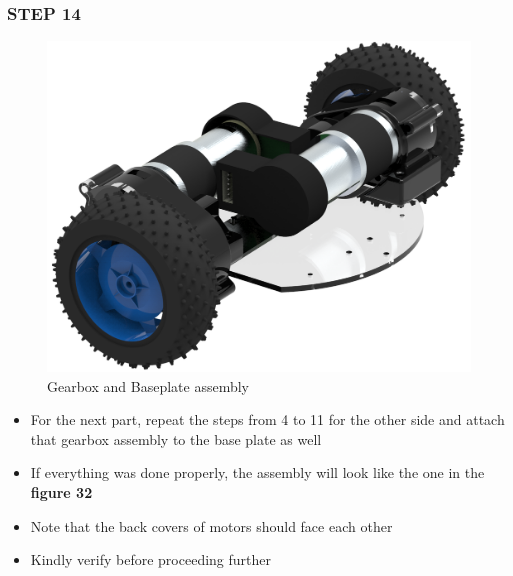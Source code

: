 \documentclass[12pt,a4paper,oneside]{book}
\begin{document}
			\subsubsection*{STEP 14}
				\begin{figure}[H]
					\begin{center}
						\includegraphics[scale=0.8]{GEARBOX + BASEPLATE}
						\caption{Gearbox and Baseplate assembly}
					\end{center}
				\end{figure}
				\begin{itemize}
					\item For the next part, repeat the steps from 4 to 11 for the other side and attach that gearbox assembly to the base plate as well
					\item If everything was done properly, the assembly will look like the one in the \textbf{figure 32}
					\item Note that the back covers of motors should face each other
					\item Kindly verify before proceeding further
				\end{itemize}
				
\end{document}
